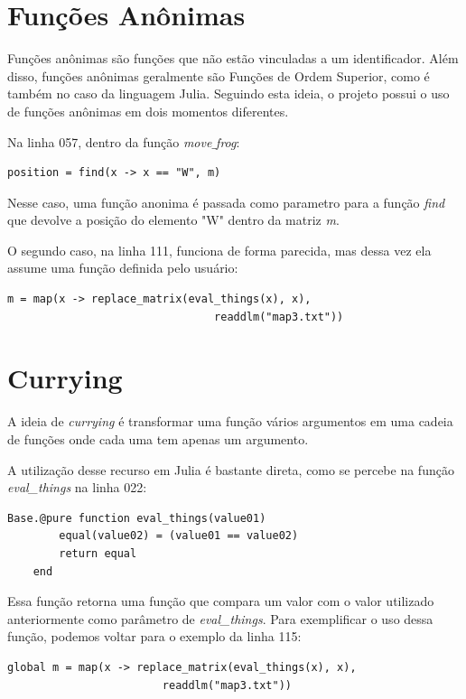 \documentclass[rel_mlp]{iiufrgs}
\begin{document}
 \section{Funções Anônimas}
    
    Funções anônimas são funções que não estão vinculadas a um identificador. Além disso, funções anônimas geralmente são Funções de Ordem Superior, como é também no caso da linguagem Julia. Seguindo esta ideia, o projeto possui o uso de funções anônimas em dois momentos diferentes.
    
    Na linha 057, dentro da função \textit{move$\_$frog}:
    \begin{lstlisting}[frame=single]
    position = find(x -> x == "W", m)
    \end{lstlisting}
    
    Nesse caso, uma função anonima é passada como parametro para a função \textit{find} que devolve a posição do elemento "W" dentro da matriz \textit{m}. 
    
    O segundo caso, na linha 111, funciona de forma parecida, mas dessa vez ela assume uma função definida pelo usuário:
    
    \begin{lstlisting}[frame=single]
    m = map(x -> replace_matrix(eval_things(x), x),
                                readdlm("map3.txt"))
    \end{lstlisting}
 
 \section{Currying}
    
    A ideia de \textit{currying} é transformar uma função vários argumentos em uma cadeia de funções onde cada uma tem apenas um argumento.
    
    A utilização desse recurso em Julia é bastante direta, como se percebe na função \textit{eval\_things} na linha 022:
    \begin{lstlisting}[frame=single]
    Base.@pure function eval_things(value01)
    	equal(value02) = (value01 == value02)
    	return equal
    end
    \end{lstlisting}
    
    Essa função retorna uma função que compara um valor com o valor utilizado anteriormente como parâmetro de \textit{eval\_things}. Para exemplificar o uso dessa função, podemos voltar para o exemplo da linha 115:
    
    \begin{lstlisting}[frame=single]
    global m = map(x -> replace_matrix(eval_things(x), x),
                        readdlm("map3.txt"))
    \end{lstlisting}
    
\end{document}
